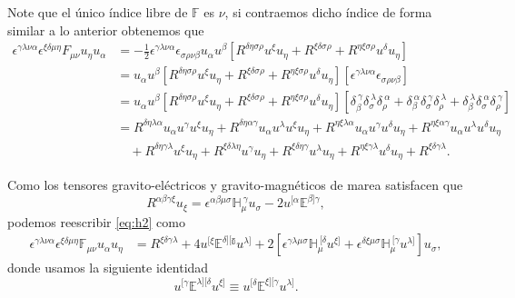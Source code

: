 Note que el único índice libre de $\mathbb{F}$ es $\nu$, si contraemos dicho índice de forma similar a lo anterior obtenemos que
\begin{align}
\epsilon^{\gamma \lambda \nu \alpha} \epsilon^{\xi \delta \mu \eta} F_{\mu \nu} u_{\eta} u_{\alpha} &= -\frac{1}{2} \epsilon^{\gamma \lambda \nu \alpha} \epsilon_{\sigma \rho \nu \beta} u_{\alpha} u^{\beta} \left[ R^{\delta \eta \sigma \rho} u^{\xi} u_{\eta} + R^{\xi \delta \sigma \rho} + R^{\eta \xi \sigma \rho} u^{\delta} u_{\eta}  \right] \nonumber \\
&=  u_{\alpha} u^{\beta} \left[ R^{\delta \eta \sigma \rho} u^{\xi} u_{\eta} + R^{\xi \delta \sigma \rho} + R^{\eta \xi \sigma \rho} u^{\delta} u_{\eta}  \right] \left[ \epsilon^{\gamma \lambda \nu \alpha} \epsilon_{\sigma \rho \nu \beta} \right] \nonumber \\
&= u_{\alpha} u^{\beta} \left[ R^{\delta \eta \sigma \rho} u^{\xi} u_{\eta} + R^{\xi \delta \sigma \rho} + R^{\eta \xi \sigma \rho} u^{\delta} u_{\eta}  \right]
\left[ \delta_{\beta}^{\ \gamma} \delta_{\sigma}^{\ \lambda} \delta_{\rho}^{\ \alpha} + \delta_{\beta}^{\ \alpha} \delta_{\sigma}^{\ \gamma} \delta_{\rho}^{\ \lambda} + \delta_{\beta}^{\ \lambda} \delta_{\sigma}^{\ \alpha} \delta_{\rho}^{\ \gamma} \right] \nonumber \\
&= R^{\delta \eta \lambda \alpha} u_{\alpha} u^{\gamma} u^{\xi} u_{\eta} + R^{\delta \eta \alpha \gamma} u_{\alpha} u^{\lambda} u^{\xi} u_{\eta} + R^{\eta \xi \lambda \alpha} u_{\alpha} u^{\gamma} u^{\delta} u_{\eta} + R^{\eta \xi \alpha \gamma} u_{\alpha} u^{\lambda} u^{\delta} u_{\eta} \nonumber \\
& \quad + R^{\delta \eta \gamma \lambda} u^{\xi} u_{\eta} + R^{\xi \delta \lambda \eta} u^{\gamma} u_{\eta} + R^{\xi \delta \eta \gamma} u^{\lambda} u_{\eta} + R^{\eta \xi \gamma \lambda} u^{\delta} u_{\eta} + R^{\xi \delta \gamma \lambda}. \label{eq:h2}
\end{align}

Como los tensores gravito-eléctricos y gravito-magnéticos de marea satisfacen que
\begin{equation}
R^{\alpha \beta \gamma \xi} u_{\xi} = \epsilon^{\alpha \beta \mu \sigma} \mathbb{H}_{\mu}^{\ \gamma} u_{\sigma} - 2 u^{[ \alpha} \mathbb{E}^{\beta ] \gamma} ,
\end{equation}
podemos reescribir \eqref{eq:h2} como
\begin{align}
\epsilon^{\gamma \lambda \nu \alpha} \epsilon^{\xi \delta \mu \eta} \mathbb{F}_{\mu \nu} u_{\alpha} u_{\eta} &= R^{\xi \delta \gamma \lambda} + 4 u^{[ \xi} \mathbb{E^{\delta] [\gamma}} u^{\lambda]} 
 + 2\left[ \epsilon^{\gamma \lambda \mu \sigma} \mathbb{H}_{\mu}^{\ [ \delta} u^{\xi ]} + \epsilon^{\delta \xi \mu \sigma} \mathbb{H}_{\mu}^{\ [ \gamma} u^{\lambda ]} \right] u_{\sigma}, \label{eq:h3}
\end{align}
donde usamos la siguiente identidad
\begin{equation}
u^{[\gamma} \mathbb{E}^{\lambda][\delta} u^{\xi ]} \equiv u^{[\delta} \mathbb{E}^{\xi][\gamma} u^{\lambda ]}.
\end{equation}

